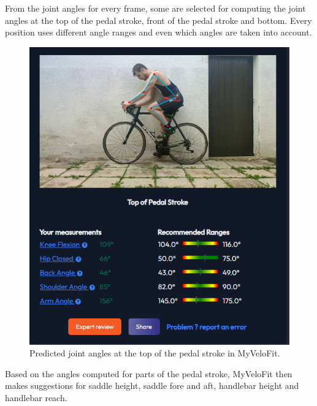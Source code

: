 From the joint angles for every frame, some are selected for computing the joint angles at the top of the pedal stroke, front of the pedal stroke and bottom. Every position uses different angle ranges and even which angles are taken into account.

\begin{figure}[htbp]
    \centering
    \includegraphics[width=\textwidth]{obrazky-figures/myvelofit_top.png}
    \caption{Predicted joint angles at the top of the pedal stroke in MyVeloFit.}
    \label{fig:myvelofit_top}
\end{figure}

Based on the angles computed for parts of the pedal stroke, MyVeloFit then makes suggestions for saddle height, saddle fore and aft, handlebar height and handlebar reach.

